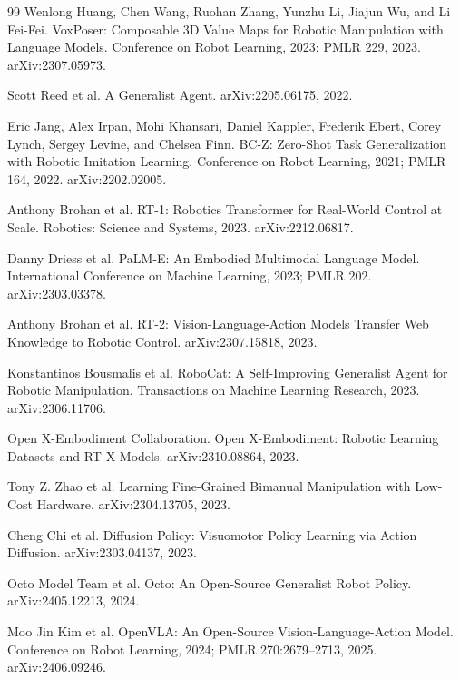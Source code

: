 \documentclass[11pt,oneside,openany]{oblivoir}
\numberwithin{section}{chapter}
\numberwithin{subsection}{section}
\numberwithin{equation}{chapter}
\begin{document}
\begin{thebibliography}{99}
Wenlong Huang, Chen Wang, Ruohan Zhang, Yunzhu Li, Jiajun Wu, and Li Fei-Fei.
\newblock VoxPoser: Composable 3D Value Maps for Robotic Manipulation with Language Models.
\newblock Conference on Robot Learning, 2023; PMLR 229, 2023. arXiv:2307.05973.

Scott Reed et al.
\newblock A Generalist Agent.
\newblock arXiv:2205.06175, 2022.

Eric Jang, Alex Irpan, Mohi Khansari, Daniel Kappler, Frederik Ebert,
Corey Lynch, Sergey Levine, and Chelsea Finn.
\newblock BC-Z: Zero-Shot Task Generalization with Robotic Imitation Learning.
\newblock Conference on Robot Learning, 2021; PMLR 164, 2022. arXiv:2202.02005.

Anthony Brohan et al.
\newblock RT-1: Robotics Transformer for Real-World Control at Scale.
\newblock Robotics: Science and Systems, 2023. arXiv:2212.06817.

Danny Driess et al.
\newblock PaLM-E: An Embodied Multimodal Language Model.
\newblock International Conference on Machine Learning, 2023; PMLR 202. arXiv:2303.03378.

Anthony Brohan et al.
\newblock RT-2: Vision-Language-Action Models Transfer Web Knowledge to Robotic Control.
\newblock arXiv:2307.15818, 2023.

Konstantinos Bousmalis et al.
\newblock RoboCat: A Self-Improving Generalist Agent for Robotic Manipulation.
\newblock Transactions on Machine Learning Research, 2023. arXiv:2306.11706.

Open X-Embodiment Collaboration.
\newblock Open X-Embodiment: Robotic Learning Datasets and RT-X Models.
\newblock arXiv:2310.08864, 2023.

Tony Z. Zhao et al.
\newblock Learning Fine-Grained Bimanual Manipulation with Low-Cost Hardware.
\newblock arXiv:2304.13705, 2023.

Cheng Chi et al.
\newblock Diffusion Policy: Visuomotor Policy Learning via Action Diffusion.
\newblock arXiv:2303.04137, 2023.

Octo Model Team et al.
\newblock Octo: An Open-Source Generalist Robot Policy.
\newblock arXiv:2405.12213, 2024.

Moo Jin Kim et al.
\newblock OpenVLA: An Open-Source Vision-Language-Action Model.
\newblock Conference on Robot Learning, 2024; PMLR 270:2679--2713, 2025. arXiv:2406.09246.


\end{thebibliography}
\end{document}
